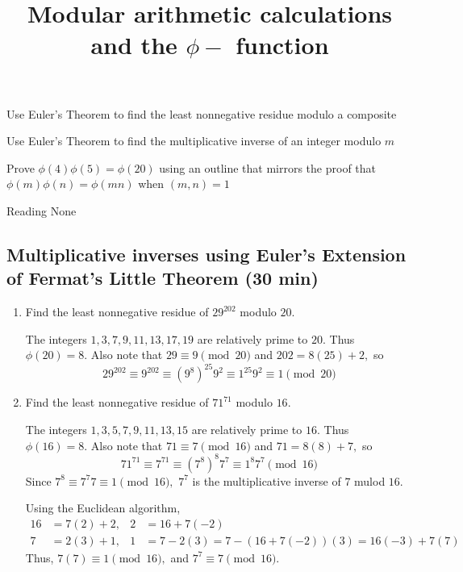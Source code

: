 \documentclass{../ximera}
\title{Modular arithmetic calculations and the $\phi-$ function}
\begin{document}
\begin{abstract}
\end{abstract}
\maketitle


\begin{obj}
\item Use Euler's Theorem to find the least nonnegative residue modulo a composite
\item Use Euler's Theorem to find the multiplicative inverse of an integer modulo $m$
\item Prove $\phi(4)\phi(5)=\phi(20)$ using an outline that mirrors the proof that $\phi(m)\phi(n)=\phi(mn)$ when $(m,n)=1$
\end{obj}


\begin{pre}
    \item[Reading] None
\end{pre}

\subsection{Multiplicative inverses using Euler's Extension of Fermat's Little Theorem (30 min)}

\begin{example}\label{ex-euler-solve-cong}
 
\begin{enumerate}
 \item Find the least nonnegative residue of $29^{202}$ modulo $20$. 
 
 The integers $1,3,7,9,11,13,17,19$ are relatively prime to $20.$ Thus $\phi(20)=8.$ Also note that $29\equiv 9\pmod{20}$ and $202=8(25)+2,$ so 
 \[29^{202}\equiv 9^{202}\equiv(9^8)^{25} 9^2\equiv 1^{25} 9^2\equiv 1\pmod{20}\] 
 
 \item Find the least nonnegative residue of $71^{71}$ modulo $16$.
 
 The integers $1,3,5,7,9,11,13,15$ are relatively prime to $16.$ Thus $\phi(16)=8.$ Also note that $71\equiv 7\pmod{16}$ and $71=8(8)+7,$ so 
  \[71^{71}\equiv 7^{71}\equiv(7^8)^{8} 7^7\equiv 1^{8} 7^7\pmod{16}\] 
Since $7^8\equiv 7^7 7\equiv 1\pmod{16},$ $7^7$ is the multiplicative inverse of $7$ mulod $16.$

Using the Euclidean algorithm, 
\begin{align*}
 16	& = 7(2) + 2,	&2&=16+7(-2)\\
 7	& = 2(3) + 1,	&1&=7-2(3)=7-(16+7(-2))(3)=16(-3)+7(7)
\end{align*}
Thus, $7(7)\equiv 1\pmod{16},$ and $7^7\equiv 7\pmod{16}.$
\end{enumerate}
\end{example}
\end{document}

